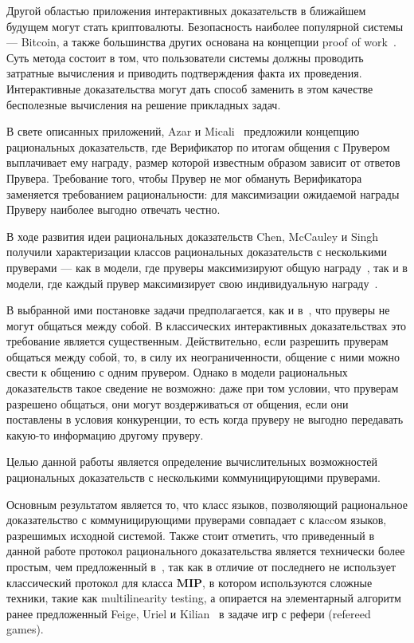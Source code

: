 \documentclass[14pt, a4paper]{extreport}
\begin{document}
Другой областью приложения интерактивных доказательств в ближайшем будущем могут стать криптовалюты. Безопасность наиболее популярной системы --- Bitcoin, а также большинства других основана на концепции proof of work~\cite{nakamoto2008bitcoin}. Суть метода состоит в том, что пользователи системы должны проводить затратные вычисления и приводить подтверждения факта их проведения. Интерактивные доказательства могут дать способ заменить в этом качестве бесполезные вычисления на решение прикладных задач.

В свете описанных приложений, Azar и Micali~\cite{azar2012rational} предложили концепцию рациональных доказательств, где Верификатор по итогам общения с Прувером выплачивает ему награду, размер которой известным образом зависит от ответов Прувера. Требование того, чтобы Прувер не мог обмануть Верификатора заменяется требованием рациональности: для максимизации ожидаемой награды Пруверу наиболее выгодно отвечать честно.

В ходе развития идеи рациональных доказательств Chen, McCauley и Singh получили характеризации классов рациональных доказательств с несколькими пруверами --- как в модели, где пруверы максимизируют общую награду~\cite{chen2016mrip}, так и в модели, где каждый прувер максимизирует свою индивидуальную награду~\cite{chen2017noncoop}.

В выбранной ими постановке задачи предполагается, как и в~\cite{babai1991mip}, что пруверы не могут общаться между собой. В классических интерактивных доказательствах это требование является существенным. Действительно, если разрешить пруверам общаться между собой, то, в силу их неограниченности, общение с ними можно свести к общению с одним прувером. Однако в модели рациональных доказательств такое сведение не возможно: даже при том условии, что пруверам разрешено общаться, они могут воздерживаться от общения, если они поставлены в условия конкуренции, то есть когда пруверу не выгодно передавать какую-то информацию другому пруверу.

Целью данной работы является определение вычислительных возможностей рациональных доказательств с несколькими коммуницирующими пруверами.

Основным результатом является то, что класс языков, позволяющий рациональное доказательство с коммуницирующими пруверами совпадает с клаccом языков, разрешимых исходной системой. Также стоит отметить, что приведенный в данной работе протокол рационального доказательства является технически более простым, чем предложенный в~\cite{chen2017noncoop}, так как в отличие от последнего не использует классический протокол для класса $\textbf{MIP}$, в котором используются сложные техники, такие как multilinearity testing, а опирается на элементарный алгоритм ранее предложенный Feige, Uriel и Kilian~\cite{feige1997refereed} в задаче игр с рефери (refereed games).
\end{document}
